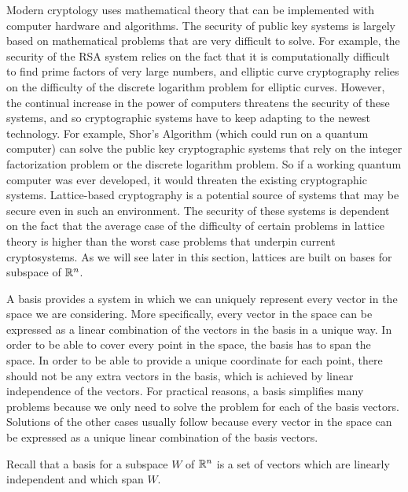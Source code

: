 Modern cryptology uses mathematical theory that can be implemented with computer hardware and algorithms. The security of public key systems is largely based on mathematical problems that are very difficult to solve. For example, the security of the RSA system relies on the fact that it is computationally difficult to find prime factors of very large numbers, and elliptic curve cryptography relies on the difficulty of the discrete logarithm problem for elliptic curves.  However, the continual increase in the power of computers threatens the security of these systems, and so cryptographic systems have to keep adapting to the newest technology. For example, Shor's Algorithm (which could run on a quantum computer) can solve the public key cryptographic systems that rely on the integer factorization problem or the discrete logarithm problem. So if a working quantum computer was ever developed, it would threaten the existing cryptographic systems. Lattice-based cryptography is a potential source of systems that may be secure even in such an environment. The security of these systems is dependent on the fact that the average case of the difficulty of certain problems in lattice theory is higher than the worst case problems that underpin current cryptosystems.  As we will see later in this section, lattices are built on bases for subspace of $\mathbb{R}^n$.

A basis provides a system in which we can uniquely represent every vector in the space we are considering. More specifically, every vector in the space can be expressed as a linear combination of the vectors in the basis in a unique way. In order to be able to cover every point in the space, the basis has to span the space. In order to be able to provide a unique coordinate for each point, there should not be any extra vectors in the basis, which is achieved by linear independence of the vectors. For practical reasons, a basis simplifies many problems because we only need to solve the problem for each of the basis vectors. Solutions of the other cases usually follow because every vector in the space can be expressed as a unique linear combination of the basis vectors.

Recall that a basis for a subspace $W$ of $\mathbb{R}^n$ is a set of vectors which are linearly independent and which span $W$. 

